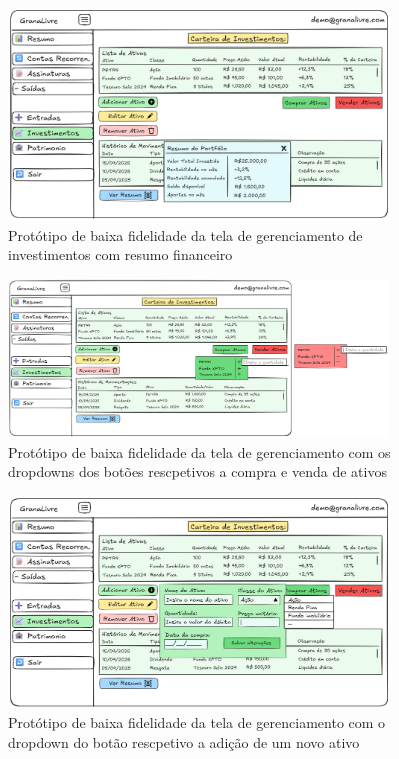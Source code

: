 \begin{figure}[H]
    \centering
    \includegraphics[width=0.9\textwidth]{imgs/08-investimentos_1.png}
    \caption{Protótipo de baixa fidelidade da tela de gerenciamento de investimentos com resumo financeiro}
    \label{fig:prot_investimentos2}
\end{figure}

\begin{figure}[H]
    \centering
    \includegraphics[width=0.9\textwidth]{imgs/08-investimentos_2.png}
    \caption{Protótipo de baixa fidelidade da tela de gerenciamento com os dropdowns dos botões rescpetivos a compra e venda de ativos}
    \label{fig:prot_investimentos3}
\end{figure}

\begin{figure}[H]
    \centering
    \includegraphics[width=0.9\textwidth]{imgs/08-investimentos_3.png}
    \caption{Protótipo de baixa fidelidade da tela de gerenciamento com o dropdown do botão rescpetivo a adição de um novo ativo}
    \label{fig:prot_investimentos4}
\end{figure}

